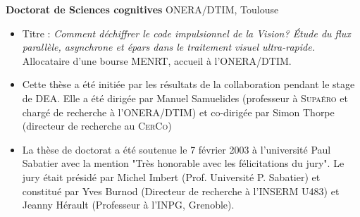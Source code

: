 \documentclass[10pt,french,a4paper]{article}%
\newcommand{\years}[1]{\marginpar{\textit{\scriptsize #1}}}
\begin{document}
\vspace*{.3cm}
	\textbf{Doctorat de Sciences cognitives} ONERA/DTIM, Toulouse \hfill \years{\textbf{1999-2003}} \\
\vspace*{-.15in}
\begin{itemize}
\item[] Titre : \emph{Comment déchiffrer le code impulsionnel de la Vision? \'Etude du flux parallèle, asynchrone et épars  dans le traitement visuel ultra-rapide.}  Allocataire d'une bourse MENRT, accueil à  l'ONERA/DTIM.
		\item %
		Cette thèse a été initiée par les résultats de la collaboration pendant le stage de DEA. Elle a été dirigée par Manuel Samuelides (professeur à  \textsc{Supaéro} et chargé de recherche à  l'ONERA/DTIM) et co-dirigée par Simon Thorpe (directeur de recherche au \textsc{CerCo})
		\item %
		La thèse de doctorat a été soutenue le 7 février 2003 à  l'université Paul Sabatier avec la mention "Très honorable avec les félicitations du jury". Le jury était présidé par Michel Imbert (Prof. Université P. Sabatier) et constitué par Yves Burnod (Directeur de recherche à  l'\textsc{INSERM} U483) et Jeanny Hérault (Professeur à  l'INPG, Grenoble).
\end{itemize} %
\end{document}

